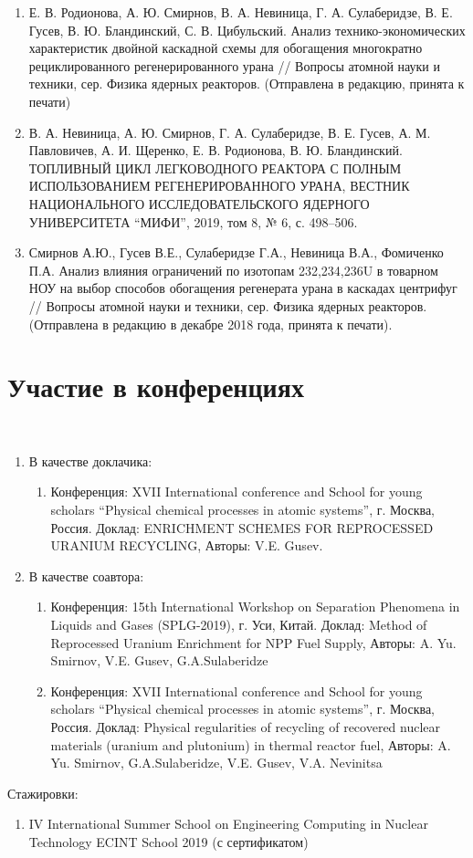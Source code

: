 \begin{enumerate}
\begin{enumerate}
        \item Е. В. Родионова, А. Ю. Смирнов, В. А. Невиница, Г. А. Сулаберидзе, В. Е. Гусев, В. Ю. Бландинский, С. В. Цибульский. Анализ технико-экономических характеристик двойной каскадной схемы для обогащения многократно рециклированного регенерированного урана // Вопросы атомной науки и техники, сер. Физика ядерных реакторов. (Отправлена в редакцию, принята к печати)
        \item В. А. Невиница, А. Ю. Смирнов, Г. А. Сулаберидзе, В. Е. Гусев,
        А. М. Павловичев, А. И. Щеренко, Е. В. Родионова, В. Ю. Бландинский. ТОПЛИВНЫЙ ЦИКЛ ЛЕГКОВОДНОГО РЕАКТОРА С ПОЛНЫМ ИСПОЛЬЗОВАНИЕМ РЕГЕНЕРИРОВАННОГО УРАНА, ВЕСТНИК НАЦИОНАЛЬНОГО ИССЛЕДОВАТЕЛЬСКОГО ЯДЕРНОГО УНИВЕРСИТЕТА “МИФИ”, 2019, том 8, № 6,
        с. 498–506.
        \item Смирнов А.Ю., Гусев В.Е., Сулаберидзе Г.А., Невиница В.А., Фомиченко П.А. Анализ влияния ограничений по изотопам 232,234,236U в товарном НОУ на выбор способов обогащения регенерата урана в каскадах центрифуг //  Вопросы атомной науки и техники, сер. Физика ядерных реакторов. (Отправлена в редакцию в декабре 2018 года, принята к печати).
        \end{enumerate}
\end{enumerate}

\section{Участие в конференциях}~\label{app:A2}

\begin{enumerate}
    \item В качестве доклачика:
    \begin{enumerate}
        \item Конференция:  XVII International conference and School for young scholars “Physical chemical processes in atomic systems”, г. Москва, Россия. Доклад: ENRICHMENT SCHEMES FOR REPROCESSED URANIUM RECYCLING, Авторы: V.E. Gusev.
    \end{enumerate}
    \item В качестве соавтора:
    \begin{enumerate}
        \item Конференция:  15th International Workshop on Separation Phenomena in Liquids and Gases (SPLG-2019), г. Уси, Китай. Доклад: Method of Reprocessed Uranium Enrichment for NPP Fuel Supply, Авторы: A. Yu. Smirnov, V.E. Gusev, G.A.Sulaberidze
        \item Конференция:  XVII International conference and School for young scholars “Physical chemical processes in atomic systems”, г. Москва, Россия. Доклад: Physical regularities of recycling of recovered nuclear materials (uranium         and plutonium) in thermal reactor fuel, Авторы: A. Yu. Smirnov, G.A.Sulaberidze, V.E. Gusev, V.A. Nevinitsa
    \end{enumerate}
\end{enumerate}

Стажировки:
    \begin{enumerate}
        \item IV International Summer School on Engineering Computing in Nuclear Technology ECINT School 2019 (с сертификатом)
    \end{enumerate}
